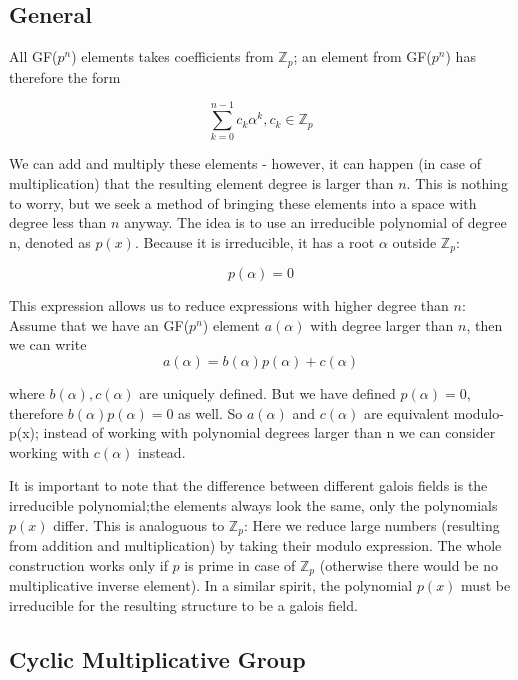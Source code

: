 
\subsection{General}\label{general}

All GF(\(p^n\)) elements takes coefficients from \(\mathbb{Z}_p\); an
element from GF(\(p^n\)) has therefore the form

\[
\sum_{k=0}^{n-1} c_k \alpha^k, c_k \in \mathbb{Z}_p
\]

We can add and multiply these elements - however, it can happen (in case
of multiplication) that the resulting element degree is larger than
\(n\). This is nothing to worry, but we seek a method of bringing these
elements into a space with degree less than \(n\) anyway. The idea is to
use an irreducible polynomial of degree n, denoted as \(p(x)\). Because
it is irreducible, it has a root \(\alpha\) outside \(\mathbb{Z}_p\):

\[
p(\alpha) = 0
\]

This expression allows us to reduce expressions with higher degree than
\(n\): Assume that we have an GF(\(p^n\)) element \(a(\alpha)\) with
degree larger than \(n\), then we can write \[
a(\alpha) = b(\alpha) p(\alpha) + c(\alpha)
\]

where \(b(\alpha), c(\alpha)\) are uniquely defined. But we have defined
\(p(\alpha)=0\), therefore \(b(\alpha) p(\alpha) = 0\) as well. So
\(a(\alpha)\) and \(c(\alpha)\) are equivalent modulo-p(x); instead of
working with polynomial degrees larger than n we can consider working
with \(c(\alpha)\) instead.

It is important to note that the difference between different galois
fields is the irreducible polynomial;the elements always look the same,
only the polynomials \(p(x)\) differ. This is analoguous to
\(\mathbb{Z}_p\): Here we reduce large numbers (resulting from addition
and multiplication) by taking their modulo expression. The whole
construction works only if \(p\) is prime in case of \(\mathbb{Z}_p\)
(otherwise there would be no multiplicative inverse element). In a
similar spirit, the polynomial \(p(x)\) must be irreducible for the
resulting structure to be a galois field.

\subsection{Cyclic Multiplicative
Group}\label{cyclic-multiplicative-group}

